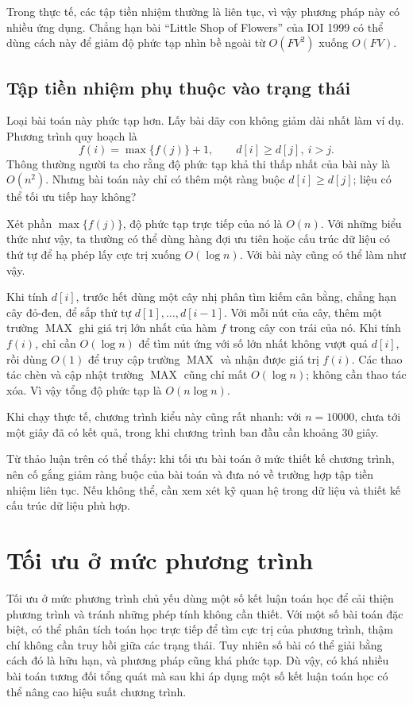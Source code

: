 \documentclass[11pt]{article}
\begin{document}
Trong thực tế, các tập tiền nhiệm thường là liên tục, vì vậy phương pháp này
có nhiều ứng dụng. Chẳng hạn bài ``Little Shop of Flowers'' của IOI 1999 có
thể dùng cách này để giảm độ phức tạp nhìn bề ngoài từ \(O(FV^2)\) xuống
\(O(FV)\).

\subsection{Tập tiền nhiệm phụ thuộc vào trạng thái}

Loại bài toán này phức tạp hơn. Lấy bài dãy con không giảm dài nhất làm ví
dụ. Phương trình quy hoạch là
\[
  f(i)=\max\{f(j)\}+1,\qquad d[i]\ge d[j],\ i>j.
\]
Thông thường người ta cho rằng độ phức tạp khả thi thấp nhất của bài này là
\(O(n^2)\). Nhưng bài toán này chỉ có thêm một ràng buộc \(d[i]\ge d[j]\); liệu
có thể tối ưu tiếp hay không?

Xét phần \(\max\{f(j)\}\), độ phức tạp trực tiếp của nó là \(O(n)\). Với những
biểu thức như vậy, ta thường có thể dùng hàng đợi ưu tiên hoặc cấu trúc dữ
liệu có thứ tự để hạ phép lấy cực trị xuống \(O(\log n)\). Với bài này cũng có
thể làm như vậy.

Khi tính \(d[i]\), trước hết dùng một cây nhị phân tìm kiếm cân bằng, chẳng
hạn cây đỏ-đen, để sắp thứ tự \(d[1],\ldots,d[i-1]\). Với mỗi nút của cây,
thêm một trường \(\operatorname{MAX}\) ghi giá trị lớn nhất của hàm \(f\) trong
cây con trái của nó. Khi tính \(f(i)\), chỉ cần \(O(\log n)\) để tìm nút ứng
với số lớn nhất không vượt quá \(d[i]\), rồi dùng \(O(1)\) để truy cập trường
\(\operatorname{MAX}\) và nhận được giá trị \(f(i)\). Các thao tác chèn và cập
nhật trường \(\operatorname{MAX}\) cũng chỉ mất \(O(\log n)\); không cần thao
tác xóa. Vì vậy tổng độ phức tạp là \(O(n\log n)\).

Khi chạy thực tế, chương trình kiểu này cũng rất nhanh: với \(n=10000\), chưa
tới một giây đã có kết quả, trong khi chương trình ban đầu cần khoảng 30 giây.

Từ thảo luận trên có thể thấy: khi tối ưu bài toán ở mức thiết kế chương
trình, nên cố gắng giảm ràng buộc của bài toán và đưa nó về trường hợp tập
tiền nhiệm liên tục. Nếu không thể, cần xem xét kỹ quan hệ trong dữ liệu và
thiết kế cấu trúc dữ liệu phù hợp.

\section{Tối ưu ở mức phương trình}

Tối ưu ở mức phương trình chủ yếu dùng một số kết luận toán học để cải thiện
phương trình và tránh những phép tính không cần thiết. Với một số bài toán đặc
biệt, có thể phân tích toán học trực tiếp để tìm cực trị của phương trình,
thậm chí không cần truy hồi giữa các trạng thái. Tuy nhiên số bài có thể giải
bằng cách đó là hữu hạn, và phương pháp cũng khá phức tạp. Dù vậy, có khá
nhiều bài toán tương đối tổng quát mà sau khi áp dụng một số kết luận toán học
có thể nâng cao hiệu suất chương trình.
\end{document}
